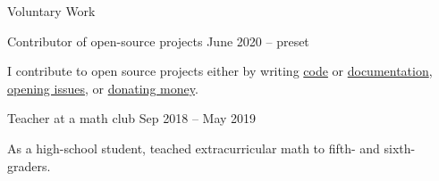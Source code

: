 \documentclass{resume}
\begin{document}
\begin{rSection}{Voluntary Work}
    \begin{rSubsection}
        {Contributor of open-source projects}
            {June 2020 -- preset}{}{}

    \item I contribute to open source projects either by writing
      \href{https://github.com/darkkeks/kks/pull/125/files}{code} or
      \href{https://github.com/hyperledger/fabric-docs-i18n/pull/80}{documentation},
      \href{https://github.com/search?q=is\%3Aopen+is\%3Aissue+author\%3ASenchoPens+archived\%3Afalse&type=}{opening issues},
      or \href{https://opencollective.com/guest-d7d943a1}{donating money}.
    \end{rSubsection}

    \begin{rSubsection}
        {Teacher at a math club}
            {Sep 2018 -- May 2019}{}{}

    \item As a high-school student, teached extracurricular math to fifth- and sixth-graders.
    \end{rSubsection}
\end{rSection}
\end{document}
